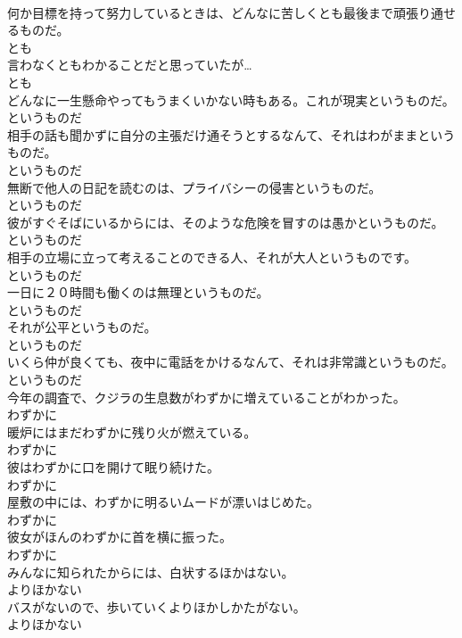 \documentclass[8pt]{extreport}
\begin{document}
\begin{CJK}{UTF8}{min}
\\	何か目標を持って努力しているときは、どんなに苦しくとも最後まで頑張り通せるものだ。	
\\	とも
\\	言わなくともわかることだと思っていたが…	
\\	とも
\\	どんなに一生懸命やってもうまくいかない時もある。これが現実というものだ。	
\\	というものだ
\\	相手の話も聞かずに自分の主張だけ通そうとするなんて、それはわがままというものだ。	
\\	というものだ
\\	無断で他人の日記を読むのは、プライバシーの侵害というものだ。	
\\	というものだ
\\	彼がすぐそばにいるからには、そのような危険を冒すのは愚かというものだ。	
\\	というものだ
\\	相手の立場に立って考えることのできる人、それが大人というものです。	
\\	というものだ
\\	一日に２０時間も働くのは無理というものだ。	
\\	というものだ
\\	それが公平というものだ。	
\\	というものだ
\\	いくら仲が良くても、夜中に電話をかけるなんて、それは非常識というものだ。	
\\	というものだ
\\	今年の調査で、クジラの生息数がわずかに増えていることがわかった。	
\\	わずかに
\\	暖炉にはまだわずかに残り火が燃えている。	
\\	わずかに
\\	彼はわずかに口を開けて眠り続けた。	
\\	わずかに
\\	屋敷の中には、わずかに明るいムードが漂いはじめた。	
\\	わずかに
\\	彼女がほんのわずかに首を横に振った。	
\\	わずかに
\\	みんなに知られたからには、白状するほかはない。	
\\	よりほかない
\\	バスがないので、歩いていくよりほかしかたがない。	
\\	よりほかない

\end{CJK}
\end{document}
